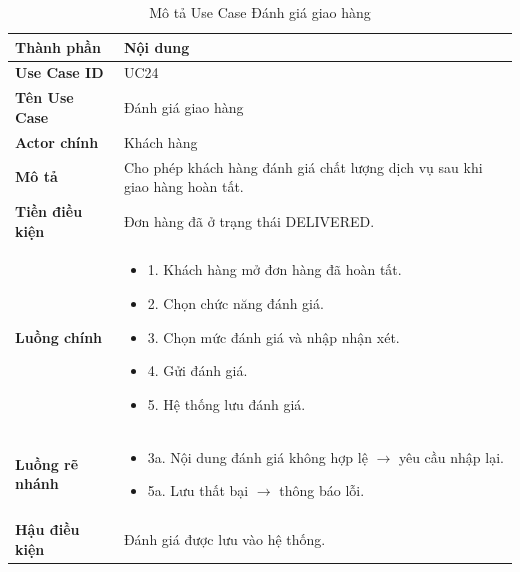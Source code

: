 \begin{longtable}{|L{3cm}|L{11cm}|}
\caption{Mô tả Use Case Đánh giá giao hàng}
\label{tab:mo-ta-uc24-danh-gia}
\\
\hline
\textbf{Thành phần} & \textbf{Nội dung} \\
\hline
\textbf{Use Case ID} & UC24 \\
\hline
\textbf{Tên Use Case} & Đánh giá giao hàng \\
\hline
\textbf{Actor chính} & Khách hàng \\
\hline
\textbf{Mô tả} & Cho phép khách hàng đánh giá chất lượng dịch vụ sau khi giao hàng hoàn tất. \\
\hline
\textbf{Tiền điều kiện} & Đơn hàng đã ở trạng thái DELIVERED. \\
\hline
\textbf{Luồng chính} & \begin{itemize}[leftmargin=*,topsep=2pt,itemsep=2pt]
\item 1. Khách hàng mở đơn hàng đã hoàn tất.
\item 2. Chọn chức năng đánh giá.
\item 3. Chọn mức đánh giá và nhập nhận xét.
\item 4. Gửi đánh giá.
\item 5. Hệ thống lưu đánh giá.
\end{itemize} \\
\hline
\textbf{Luồng rẽ nhánh} & \begin{itemize}[leftmargin=*,topsep=2pt,itemsep=2pt]
\item 3a. Nội dung đánh giá không hợp lệ $\rightarrow$ yêu cầu nhập lại.
\item 5a. Lưu thất bại $\rightarrow$ thông báo lỗi.
\end{itemize} \\
\hline
\textbf{Hậu điều kiện} & Đánh giá được lưu vào hệ thống. \\
\hline
\end{longtable}

